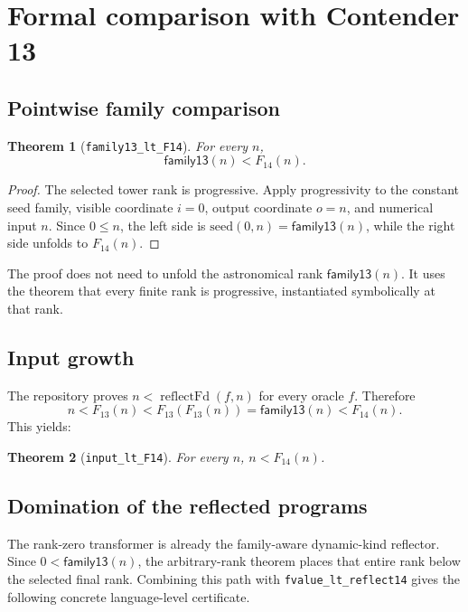 \documentclass[11pt]{article}
\newtheorem{theorem}{Theorem}[section]
\theoremstyle{definition}
\theoremstyle{remark}
\newcommand{\lean}[1]{\texttt{#1}}
\begin{document}
\section{Formal comparison with Contender 13}

\subsection{Pointwise family comparison}

\begin{theorem}[\lean{family13\_lt\_F14}]
For every $n$,
\[
\mathsf{family13}(n)<F_{14}(n).
\]
\end{theorem}

\begin{proof}
The selected tower rank is progressive.  Apply progressivity to the constant
seed family, visible coordinate $i=0$, output coordinate $o=n$, and numerical
input $n$.  Since $0\le n$, the left side is
$\mathrm{seed}(0,n)=\mathsf{family13}(n)$, while the right side unfolds to
$F_{14}(n)$.
\end{proof}

The proof does not need to unfold the astronomical rank
$\mathsf{family13}(n)$.  It uses the theorem that every finite rank is
progressive, instantiated symbolically at that rank.

\subsection{Input growth}

The repository proves $n<\operatorname{reflectFd}(f,n)$ for every oracle $f$.
Therefore
\[
n<F_{13}(n)<F_{13}(F_{13}(n))=\mathsf{family13}(n)<F_{14}(n).
\]
This yields:

\begin{theorem}[\lean{input\_lt\_F14}]
For every $n$, $n<F_{14}(n)$.
\end{theorem}

\subsection{Domination of the reflected programs}

The rank-zero transformer is already the family-aware dynamic-kind reflector.
Since $0<\mathsf{family13}(n)$, the arbitrary-rank theorem places that entire
rank below the selected final rank.  Combining this path with
\lean{fvalue\_lt\_reflect14} gives the following concrete language-level
certificate.
\end{document}
